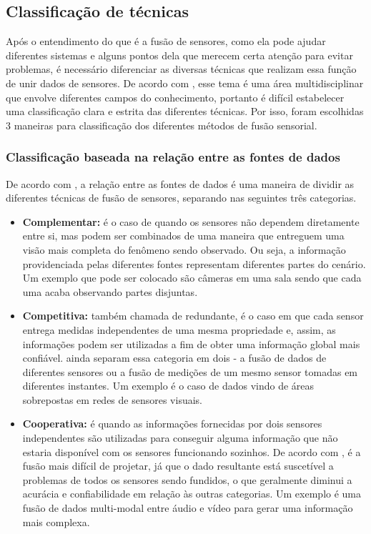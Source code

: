 \documentclass[acronym, symbols, table, deposito]{fei}
\begin{document}
		\subsection{Classificação de técnicas}
			Após o entendimento do que é a fusão de sensores, como ela pode ajudar diferentes sistemas e alguns pontos dela que merecem certa atenção para evitar problemas, é necessário diferenciar as diversas técnicas que realizam essa função de unir dados de sensores. De acordo com \textcite{castanedo2013review}, esse tema é uma área multidisciplinar que envolve diferentes campos do conhecimento, portanto é difícil estabelecer uma classificação clara e estrita das diferentes técnicas. Por isso, foram escolhidas 3 maneiras para classificação dos diferentes métodos de fusão sensorial.
			
			\subsubsection{Classificação baseada na relação entre as fontes de dados}
				De acordo com \textcite{castanedo2013review}, a relação entre as fontes de dados é uma maneira de dividir as diferentes técnicas de fusão de sensores, separando nas seguintes três categorias.
				
				\begin{itemize}
					\item \textbf{Complementar:} é o caso de quando os sensores não dependem diretamente entre si, mas podem ser combinados de uma maneira que entreguem uma visão mais completa do fenômeno sendo observado. Ou seja, a informação providenciada pelas diferentes fontes representam diferentes partes do cenário. Um exemplo que pode ser colocado são câmeras em uma sala sendo que cada uma acaba observando partes disjuntas.
					
					\item \textbf{Competitiva:} também chamada de redundante, é o caso em que cada sensor entrega medidas independentes de uma mesma propriedade e, assim, as informações podem ser utilizadas a fim de obter uma informação global mais confiável. \textcite{visser1999organisation} ainda separam essa categoria em dois - a fusão de dados de diferentes sensores ou a fusão de medições de um mesmo sensor tomadas em diferentes instantes. Um exemplo é o caso de dados vindo de áreas sobrepostas em redes de sensores visuais.
					
					\item \textbf{Cooperativa:} é quando as informações fornecidas por dois sensores independentes são utilizadas para conseguir alguma informação que não estaria disponível com os sensores funcionando sozinhos. De acordo com \textcite{brooks1998multi}, é a fusão mais difícil de projetar, já que o dado resultante está suscetível a problemas de todos os sensores sendo fundidos, o que geralmente diminui a acurácia e confiabilidade em relação às outras categorias. Um exemplo é uma fusão de dados multi-modal entre áudio e vídeo para gerar uma informação mais complexa.
				\end{itemize}
				
\end{document}
